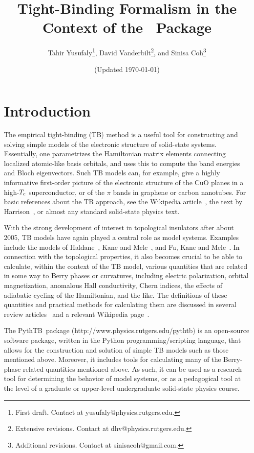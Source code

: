 \documentclass[11pt]{article}
\title{\Large Tight-Binding Formalism in the Context of the \PythTB\ Package}
\author{Tahir Yusufaly\footnote{First draft. Contact at
yusufaly@physics.rutgers.edu.},
David Vanderbilt\footnote{Extensive revisions.  Contact at
dhv@physics.rutgers.edu.}, and
Sinisa Coh\footnote{Additional revisions.  Contact at
sinisacoh@gmail.com.}
}
\date{(Updated \today)}
\numberwithin{equation}{section} %
\def\PythTB{{\sc PythTB}}
\begin{document}
\maketitle

\section{Introduction}

The empirical tight-binding (TB) method is a useful tool for
constructing and solving simple models of the electronic structure
of solid-state systems.  Essentially, one parametrizes the
Hamiltonian matrix elements connecting localized atomic-like basis orbitals,
and uses this to compute the band energies and Bloch eigenvectors.
Such TB models can, for example, give a highly informative first-order
picture of the electronic structure of the CuO planes in a
high-$T_{\rm c}$ superconductor, or of the $\pi$ bands in
graphene or carbon nanotubes.  For basic references about the
TB approach, see the Wikipedia article~\cite{wiki-tb},
the text by Harrison~\cite{harrison-book},
or almost any standard solid-state physics text.

With the strong development of interest in topological insulators
after about 2005, TB models have again played a central role as
model systems.  Examples include the models of Haldane~\cite{haldane},
Kane and Mele~\cite{km}, and Fu, Kane and Mele~\cite{fkm}.
In connection with the topological properties, it also becomes
crucial to be able to calculate, within the context of the
TB model, various quantities that are related in some way to
Berry phases or curvatures, including electric polarization,
orbital magnetization, anomalous Hall conductivity, Chern
indices, the effects of adiabatic cycling of the Hamiltonian,
and the like.  The definitions of these quantities and practical
methods for calculating them are discussed in several review
articles~\cite{resta-rmp,vand-resta,xcn,resta-jpcm} and
a relevant Wikipedia page~\cite{wiki-berry}.

The \PythTB\ package (http://www.physics.rutgers.edu/pythtb)
is an open-source software package, written in
the Python programming/scripting language, that
allows for the construction and solution of simple TB models
such as those mentioned above.  Moreover, it includes tools
for calculating many of the Berry-phase related quantities mentioned
above.  As such, it can be used as a research tool for determining
the behavior of model systems, or as a pedagogical tool at the
level of a graduate or upper-level undergraduate solid-state
physics course.
\end{document}
